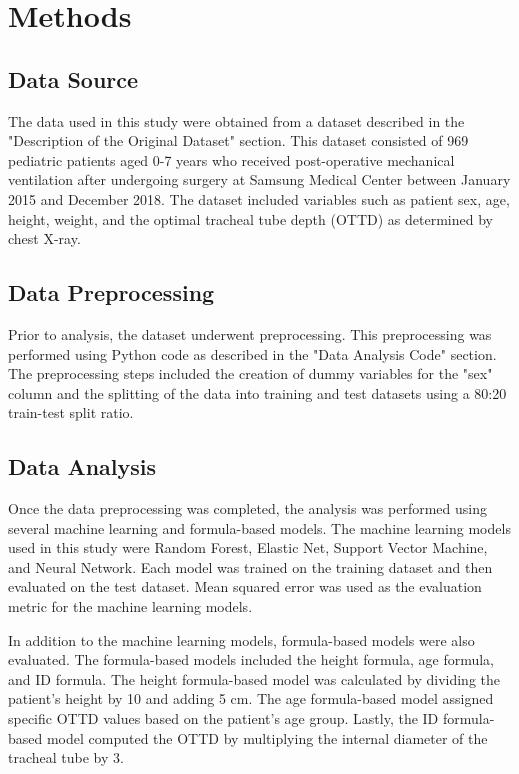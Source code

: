 \documentclass[11pt]{article}
\begin{document}
\section*{Methods}

\subsection*{Data Source}
The data used in this study were obtained from a dataset described in the "Description of the Original Dataset" section. This dataset consisted of 969 pediatric patients aged 0-7 years who received post-operative mechanical ventilation after undergoing surgery at Samsung Medical Center between January 2015 and December 2018. The dataset included variables such as patient sex, age, height, weight, and the optimal tracheal tube depth (OTTD) as determined by chest X-ray.

\subsection*{Data Preprocessing}
Prior to analysis, the dataset underwent preprocessing. This preprocessing was performed using Python code as described in the "Data Analysis Code" section. The preprocessing steps included the creation of dummy variables for the "sex" column and the splitting of the data into training and test datasets using a 80:20 train-test split ratio.

\subsection*{Data Analysis}
Once the data preprocessing was completed, the analysis was performed using several machine learning and formula-based models. The machine learning models used in this study were Random Forest, Elastic Net, Support Vector Machine, and Neural Network. Each model was trained on the training dataset and then evaluated on the test dataset. Mean squared error was used as the evaluation metric for the machine learning models.

In addition to the machine learning models, formula-based models were also evaluated. The formula-based models included the height formula, age formula, and ID formula. The height formula-based model was calculated by dividing the patient's height by 10 and adding 5 cm. The age formula-based model assigned specific OTTD values based on the patient's age group. Lastly, the ID formula-based model computed the OTTD by multiplying the internal diameter of the tracheal tube by 3.
\end{document}
